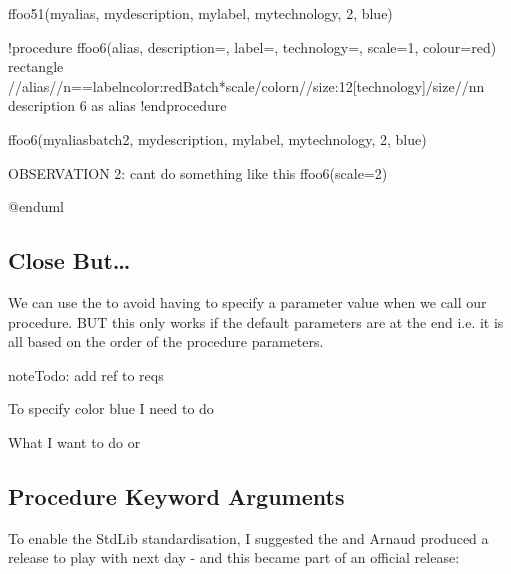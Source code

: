 \documentclass[letterpaper,10pt,english]{sphinxmanual}
\begin{document}
\begin{sphinxVerbatim}[commandchars=\\\{\},numbers=left,firstnumber=1,stepnumber=1]
\PYGZdl{}ffoo51(myalias, mydescription, mylabel, mytechnology, 2, blue)


!procedure \PYGZdl{}ffoo6(\PYGZdl{}alias, \PYGZdl{}description=\PYGZdq{}\PYGZdq{}, \PYGZdl{}label=\PYGZdq{}\PYGZdq{}, \PYGZdl{}technology=\PYGZdq{}\PYGZdq{}, \PYGZdl{}scale=1, \PYGZdl{}colour=red)
    rectangle \PYGZdq{}\PYGZlt{}\PYGZlt{}//\PYGZdl{}alias//\PYGZgt{}\PYGZgt{}\PYGZbs{}n==\PYGZdl{}label\PYGZbs{}n\PYGZlt{}color:red\PYGZgt{}\PYGZlt{}\PYGZdl{}Batch*\PYGZdl{}scale\PYGZgt{}\PYGZlt{}/color\PYGZgt{}\PYGZbs{}n//\PYGZlt{}size:12\PYGZgt{}[\PYGZdl{}technology]\PYGZlt{}/size\PYGZgt{}//\PYGZbs{}n\PYGZbs{}n  \PYGZdl{}description 6 \PYGZdq{} as \PYGZdl{}alias
!endprocedure

\PYGZdl{}ffoo6(\PYGZdq{}myaliasbatch2\PYGZdq{}, \PYGZdq{}mydescription\PYGZdq{}, \PYGZdq{}mylabel\PYGZdq{}, \PYGZdq{}mytechnology\PYGZdq{}, 2, blue)



\PYGZsq{}OBSERVATION 2: can\PYGZsq{}t do something like this 
\PYGZsq{}    \PYGZdl{}ffoo6(\PYGZdl{}scale=2)

@enduml
\end{sphinxVerbatim}


\subsection{Close But…}
\label{\detokenize{Stdlib/StandardisingStdLib:close-but}}
We can use the  to avoid having to specify a parameter value when we call our procedure.
BUT this only works if the default parameters are at the end i.e. it is all based on the order of the procedure parameters.


\begin{sphinxadmonition}{note}{\label{\detokenize{Stdlib/StandardisingStdLib:id1}}Todo:}
add ref to reqs
\end{sphinxadmonition}

To specify color blue I need to do


What I want to do
or


\subsection{Procedure Keyword Arguments}
\label{\detokenize{Stdlib/StandardisingStdLib:procedure-keyword-arguments}}
To enable the StdLib standardisation, I suggested the  and Arnaud produced a release to play with next day - and this became part of an official release:
\end{document}
